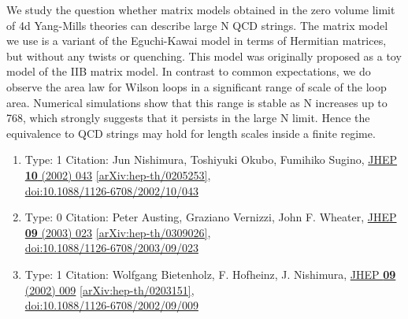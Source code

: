 \documentclass[a4paper,10pt]{article}
\begin{document}
\begin{enumerate}
We study the question whether matrix models obtained in the zero volume limit of 4d Yang-Mills theories can describe large N QCD strings. The matrix model we use is a variant of the Eguchi-Kawai model in terms of Hermitian matrices, but without any twists or quenching. This model was originally proposed as a toy model of the IIB matrix model. In contrast to common expectations, we do observe the area law for Wilson loops in a significant range of scale of the loop area. Numerical simulations show that this range is stable as N increases up to 768, which strongly suggests that it persists in the large N limit. Hence the equivalence to QCD strings may hold for length scales inside a finite regime.
\begin{enumerate}
  \item Type: 1 Citation: Jun Nishimura, Toshiyuki Okubo, Fumihiko Sugino, \href{https://www.doi.org/10.1088/1126-6708/2002/10/043}{JHEP {\bf 10} (2002) 043}  \href{https://arxiv.org/abs/hep-th/0205253}{[arXiv:hep-th/0205253]},\\\href{https://www.doi.org/10.1088/1126-6708/2002/10/043}{doi:10.1088/1126-6708/2002/10/043}
  \item Type: 0 Citation: Peter Austing, Graziano Vernizzi, John F. Wheater, \href{https://www.doi.org/10.1088/1126-6708/2003/09/023}{JHEP {\bf 09} (2003) 023}  \href{https://arxiv.org/abs/hep-th/0309026}{[arXiv:hep-th/0309026]},\\\href{https://www.doi.org/10.1088/1126-6708/2003/09/023}{doi:10.1088/1126-6708/2003/09/023}
  \item Type: 1 Citation: Wolfgang Bietenholz, F. Hofheinz, J. Nishimura, \href{https://www.doi.org/10.1088/1126-6708/2002/09/009}{JHEP {\bf 09} (2002) 009}  \href{https://arxiv.org/abs/hep-th/0203151}{[arXiv:hep-th/0203151]},\\\href{https://www.doi.org/10.1088/1126-6708/2002/09/009}{doi:10.1088/1126-6708/2002/09/009}

\end{enumerate}
\end{enumerate}
\end{document}
